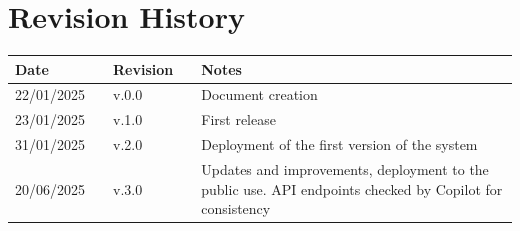 \chapter*{Revision History}

\begin{table}[h]
    \centering
    \begin{tabular}{l p{.5cm} l p{1cm} p{8cm}}
        \hline
        \textbf{Date} &  & \textbf{Revision} &  & \textbf{Notes}                                                                                           \\ \hline
        22/01/2025    &  & v.0.0             &  & Document creation                                                                                        \\
        23/01/2025    &  & v.1.0             &  & First release                                                                                            \\
        31/01/2025    &  & v.2.0             &  & Deployment of the first version of the system                                                            \\
        20/06/2025    &  & v.3.0             &  & Updates and improvements, deployment to the public use. API endpoints checked by Copilot for consistency \\ \hline
    \end{tabular}
\end{table}

\newpage